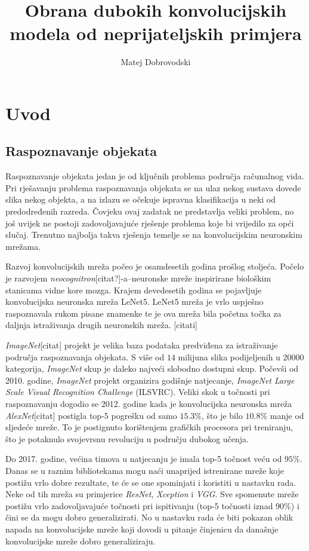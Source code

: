 \documentclass[utf8, diplomski]{fer}
\begin{document}

\title{Obrana dubokih konvolucijskih modela od neprijateljskih primjera}

\author{Matej Dobrovodski}

\maketitle

\tableofcontents

\chapter{Uvod}
\section{Raspoznavanje objekata}
Raspoznavanje objekata jedan je od ključnih problema područja računalnog vida. Pri rješavanju problema raspoznavanja objekata se na ulaz nekog sustava dovede slika nekog objekta, a na izlazu se očekuje ispravna klasifikacija u neki od predodređenih razreda. Čovjeku ovaj zadatak ne predstavlja veliki problem, no još uvijek ne postoji zadovoljavajuće rješenje problema koje bi vrijedilo za opći slučaj. Trenutno najbolja takva rješenja temelje se na konvolucijskim neuronskim mrežama. \par
Razvoj konvolucijskih mreža počeo je osamdesetih godina prošlog stoljeća. Počelo je razvojem \textit{neocognitron}[citat?]-a--neuronske mreže inspirirane biološkim stanicama vidne kore mozga. Krajem devedesetih godina se pojavljuje konvolucijska neuronska mreža LeNet5. LeNet5 mreža je vrlo uspješno raspoznavala rukom pisane znamenke te je ova mreža bila početna točka za daljnja istraživanja drugih neuronskih mreža. [citati] \par
\textit{ImageNet}[citat] projekt je velika baza podataka predviđena za istraživanje područja raspoznavanja objekata. S više od $14$ milijuna slika podijeljenih u $20000$ kategorija, \textit{ImageNet} skup je daleko najveći slobodno dostupni skup. Počevši od 2010. godine, \textit{ImageNet} projekt organizira godišnje natjecanje, \textit{ImageNet Large Scale Visual Recognition Challenge} (ILSVRC). Veliki skok u točnosti pri raspoznavanju dogodio se 2012. godine kada je konvolucijska neuronska mreža \textit{AlexNet}[citat] postigla top-5 pogrešku od samo $15.3\%$, što je bilo $10.8\%$ manje od sljedeće mreže. To je postignuto korištenjem grafičkih procesora pri treniranju, što je potaknulo svojevrsnu revoluciju u području dubokog učenja. \par
Do 2017. godine, većina timova u natjecanju je imala top-5 točnost veću od $95\%$. Danas se u raznim bibliotekama mogu naći unaprijed istrenirane mreže koje postižu vrlo dobre rezultate, te će se one spominjati i koristiti u nastavku rada. Neke od tih mreža su primjerice \textit{ResNet}, \textit{Xception} i \textit{VGG}. Sve spomenute mreže postižu vrlo zadovoljavajuće točnosti pri ispitivanju (top-5 točnosti iznad $90\%$) i čini se da mogu dobro generalizirati. No u nastavku rada će biti pokazan oblik napada na konvolucijske mreže koji dovodi u pitanje činjenicu da današnje konvolucijske mreže dobro generaliziraju.
\end{document}
